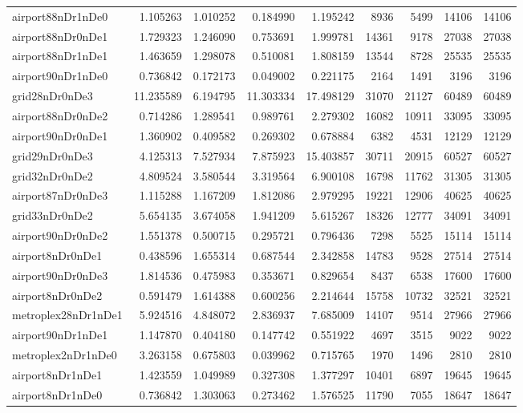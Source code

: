 \begin{longtable}{|l|r|r|r|r|r|r|r|r|}
airport88nDr1nDe0 & 1.105263 & 1.010252 & 0.184990 & 1.195242 & 8936 & 5499 & 14106 & 14106 \\
airport88nDr0nDe1 & 1.729323 & 1.246090 & 0.753691 & 1.999781 & 14361 & 9178 & 27038 & 27038 \\
airport88nDr1nDe1 & 1.463659 & 1.298078 & 0.510081 & 1.808159 & 13544 & 8728 & 25535 & 25535 \\
airport90nDr1nDe0 & 0.736842 & 0.172173 & 0.049002 & 0.221175 & 2164 & 1491 & 3196 & 3196 \\
grid28nDr0nDe3 & 11.235589 & 6.194795 & 11.303334 & 17.498129 & 31070 & 21127 & 60489 & 60489 \\
airport88nDr0nDe2 & 0.714286 & 1.289541 & 0.989761 & 2.279302 & 16082 & 10911 & 33095 & 33095 \\
airport90nDr0nDe1 & 1.360902 & 0.409582 & 0.269302 & 0.678884 & 6382 & 4531 & 12129 & 12129 \\
grid29nDr0nDe3 & 4.125313 & 7.527934 & 7.875923 & 15.403857 & 30711 & 20915 & 60527 & 60527 \\
grid32nDr0nDe2 & 4.809524 & 3.580544 & 3.319564 & 6.900108 & 16798 & 11762 & 31305 & 31305 \\
airport87nDr0nDe3 & 1.115288 & 1.167209 & 1.812086 & 2.979295 & 19221 & 12906 & 40625 & 40625 \\
grid33nDr0nDe2 & 5.654135 & 3.674058 & 1.941209 & 5.615267 & 18326 & 12777 & 34091 & 34091 \\
airport90nDr0nDe2 & 1.551378 & 0.500715 & 0.295721 & 0.796436 & 7298 & 5525 & 15114 & 15114 \\
airport8nDr0nDe1 & 0.438596 & 1.655314 & 0.687544 & 2.342858 & 14783 & 9528 & 27514 & 27514 \\
airport90nDr0nDe3 & 1.814536 & 0.475983 & 0.353671 & 0.829654 & 8437 & 6538 & 17600 & 17600 \\
airport8nDr0nDe2 & 0.591479 & 1.614388 & 0.600256 & 2.214644 & 15758 & 10732 & 32521 & 32521 \\
metroplex28nDr1nDe1 & 5.924516 & 4.848072 & 2.836937 & 7.685009 & 14107 & 9514 & 27966 & 27966 \\
airport90nDr1nDe1 & 1.147870 & 0.404180 & 0.147742 & 0.551922 & 4697 & 3515 & 9022 & 9022 \\
metroplex2nDr1nDe0 & 3.263158 & 0.675803 & 0.039962 & 0.715765 & 1970 & 1496 & 2810 & 2810 \\
airport8nDr1nDe1 & 1.423559 & 1.049989 & 0.327308 & 1.377297 & 10401 & 6897 & 19645 & 19645 \\
airport8nDr1nDe0 & 0.736842 & 1.303063 & 0.273462 & 1.576525 & 11790 & 7055 & 18647 & 18647 \\

\end{longtable}
